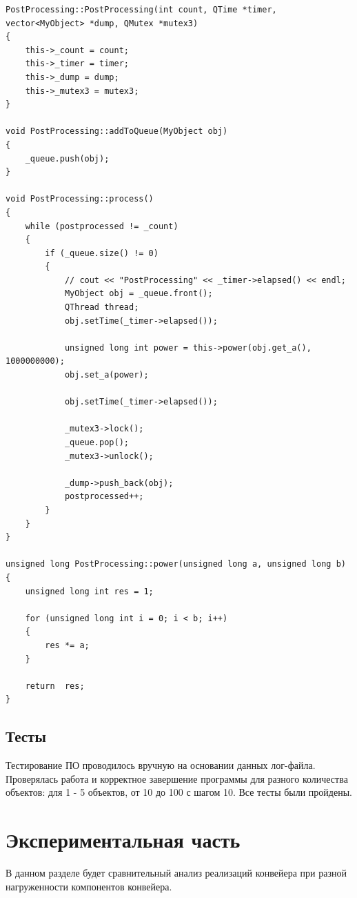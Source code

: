\documentclass[a4paper,14pt]{report}
\begin{document}
\begin{lstlisting}[label=some-code,caption=Реализация класса PostProcessing]
PostProcessing::PostProcessing(int count, QTime *timer, vector<MyObject> *dump, QMutex *mutex3)
{
    this->_count = count;
    this->_timer = timer;
    this->_dump = dump;
    this->_mutex3 = mutex3;
}

void PostProcessing::addToQueue(MyObject obj)
{
    _queue.push(obj);
}

void PostProcessing::process()
{
    while (postprocessed != _count)
    {
        if (_queue.size() != 0)
        {
            // cout << "PostProcessing" << _timer->elapsed() << endl;
            MyObject obj = _queue.front();
            QThread thread;
            obj.setTime(_timer->elapsed());

            unsigned long int power = this->power(obj.get_a(), 1000000000);
            obj.set_a(power);

            obj.setTime(_timer->elapsed());

            _mutex3->lock();
            _queue.pop();
            _mutex3->unlock();

            _dump->push_back(obj);
            postprocessed++;
        }
    }
}

unsigned long PostProcessing::power(unsigned long a, unsigned long b)
{
    unsigned long int res = 1;

    for (unsigned long int i = 0; i < b; i++)
    {
        res *= a;
    }

    return  res;
}

\end{lstlisting}

\section*{Тесты}

Тестирование ПО проводилось вручную на основании данных лог-файла. Проверялась работа и корректное завершение программы для разного количества объектов: для 1 - 5 объектов, от 10 до 100 с шагом 10. Все тесты были пройдены.

\chapter*{Экспериментальная часть}

В данном разделе будет сравнительный анализ реализаций конвейера при разной нагруженности компонентов конвейера.
\end{document}
